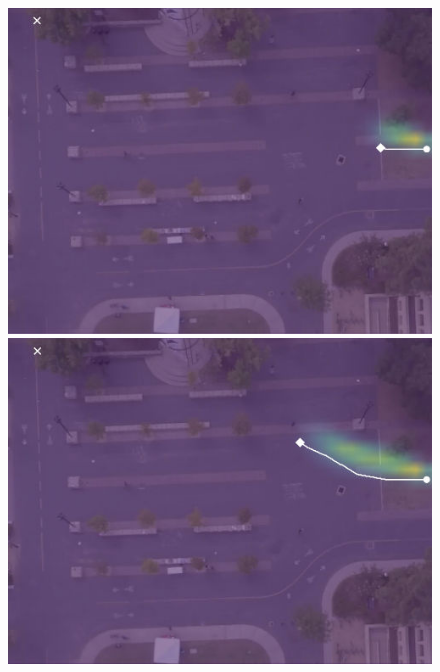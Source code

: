 \documentclass[letterpaper,10pt,conference]{ieeeconf}
\begin{document}
\begin{figure}
	\vspace{0.1cm}
	\begin{minipage}[c]{0.5cm}
	\end{minipage}
	\begin{minipage}[c]{0.3\linewidth}
		\includegraphics[width=\linewidth]{./figures/bookstore/kit_1_2_t=50.jpg}
	\end{minipage}
	\begin{minipage}[c]{0.3\linewidth}
		\includegraphics[width=\linewidth]{./figures/bookstore/kit_1_2_t=130.jpg}
	\end{minipage}
	\begin{minipage}[c]{0.3\linewidth}

\end{minipage}
\end{figure}
\end{document}
